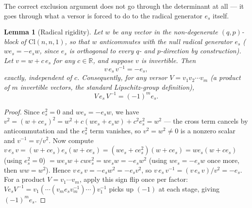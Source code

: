 \documentclass[11pt]{article}
\newtheorem{lemma}{Lemma}
\newcommand{\Cl}{\mathrm{Cl}}
\begin{document}
The correct exclusion argument does not go through the determinant at all — it goes through what a versor is forced to do to the radical generator $e_s$ itself.

\begin{lemma}[Radical rigidity]
\label{lem:radical-rigidity}
Let $w$ be any vector in the non-degenerate $(q,p)$-block of $\Cl(n,n,1)$, so that $w$ anticommutes with the null radical generator $e_s$ ($w e_s = -e_s w$, since $e_s$ is orthogonal to every $q$- and $p$-direction by construction). Let $v = w + c\,e_s$ for any $c\in\mathbb{R}$, and suppose $v$ is invertible. Then
\[
v\,e_s\,v^{-1} = -e_s,
\]
exactly, independent of $c$. Consequently, for any versor $V = v_1v_2\cdots v_m$ (a product of $m$ invertible vectors, the standard Lipschitz-group definition),
\[
V\,e_s\,V^{-1} = (-1)^m e_s.
\]
\end{lemma}

\begin{proof}
Since $e_s^2=0$ and $w e_s=-e_sw$, we have $v^2 = (w+ce_s)^2 = w^2 + c(we_s+e_sw) + c^2e_s^2 = w^2$ — the cross term cancels by anticommutation and the $e_s^2$ term vanishes, so $v^2=w^2\ne0$ is a nonzero scalar and $v^{-1}=v/v^2$. Now compute $v\,e_s\,v = (w+ce_s)e_s(w+ce_s) = (we_s+ce_s^2)(w+ce_s) = we_s(w+ce_s)$ (using $e_s^2=0$) $= we_sw + cwe_s^2 = we_sw = -e_sw^2$ (using $we_s=-e_sw$ once more, then $ww=w^2$). Hence $v\,e_s\,v = -e_s w^2 = -e_s v^2$, so $v\,e_s\,v^{-1} = (v\,e_s\,v)/v^2 = -e_s$. For a product $V=v_1\cdots v_m$, apply this sign flip once per factor: $V e_s V^{-1} = v_1(\cdots(v_m e_s v_m^{-1})\cdots)v_1^{-1}$ picks up $(-1)$ at each stage, giving $(-1)^m e_s$.
\end{proof}
\end{document}
